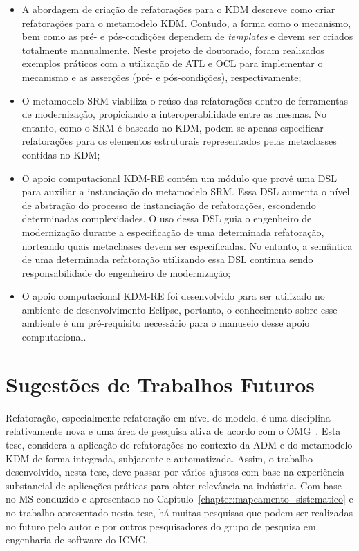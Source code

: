 \begin{itemize}

\item A abordagem de criação de refatorações para o KDM descreve como criar refatorações para o metamodelo KDM. Contudo, a forma como o mecanismo, bem como as pré- e pós-condições dependem de \textit{templates} e devem ser criados totalmente manualmente. Neste projeto de doutorado, foram realizados exemplos práticos com a utilização de ATL e OCL para implementar o mecanismo e as asserções (pré- e pós-condições), respectivamente;

\item O metamodelo SRM viabiliza o reúso das refatorações dentro de ferramentas de modernização, propiciando a interoperabilidade entre as mesmas. No entanto, como o SRM é baseado no KDM, podem-se apenas especificar refatorações para os elementos estruturais representados pelas metaclasses contidas no KDM;  


\item O apoio computacional KDM-RE contém um módulo que provê uma DSL para auxiliar a instanciação do metamodelo SRM. Essa DSL aumenta o nível de abstração do processo de instanciação de refatorações, escondendo determinadas complexidades. O uso dessa DSL guia o engenheiro de modernização durante a especificação de uma determinada refatoração, norteando quais metaclasses devem ser especificadas. No entanto, a semântica de uma determinada refatoração utilizando essa DSL continua sendo responsabilidade do engenheiro de modernização;


\item O apoio computacional KDM-RE foi desenvolvido para ser utilizado no ambiente de desenvolvimento Eclipse, portanto, o conhecimento sobre esse ambiente é um pré-requisito necessário para o manuseio desse apoio computacional.
\end{itemize}

\section{Sugestões de Trabalhos Futuros}\label{sec:trabalhos_futuros_tese}

Refatoração, especialmente refatoração em nível de modelo, é uma disciplina relativamente nova e uma área de pesquisa ativa de acordo com o OMG~\cite{OMG_OMG, ADM:OMG}. Esta tese, considera a aplicação de refatorações no contexto da ADM e do metamodelo KDM de forma integrada, subjacente e automatizada. Assim, o trabalho desenvolvido, nesta tese, deve passar por vários ajustes com base na experiência substancial de aplicações práticas para obter relevância na indústria. Com base no MS conduzido e apresentado no Capítulo~\ref{chapter:mapeamento_sistematico} e no trabalho apresentado nesta tese, há muitas pesquisas que podem ser realizadas no futuro pelo autor e por outros pesquisadores do grupo de pesquisa em engenharia de software do ICMC.

